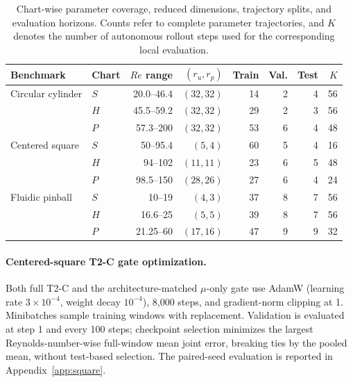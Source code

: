 \documentclass{article}
\begin{document}
\par


\begin{table}[H]
\centering
\caption{
Chart-wise parameter coverage, reduced dimensions, trajectory splits, and evaluation horizons. Counts refer to complete parameter trajectories, and $K$ denotes the number of autonomous rollout steps used for the corresponding local evaluation.
}
\label{tab:chart_splits}
\small
\setlength{\tabcolsep}{3.5pt}
\begin{tabular}{@{}llrrrrrr@{}}
\toprule
Benchmark & Chart & $Re$ range & $(r_u,r_p)$ & Train & Val. & Test & $K$ \\
\midrule
Circular cylinder
& $S$ & 20.0--46.4 & $(32,32)$ & 14 & 2 & 4 & 56 \\
& $H$ & 45.5--59.2 & $(32,32)$ & 29 & 2 & 3 & 56 \\
& $P$ & 57.3--200 & $(32,32)$ & 53 & 6 & 4 & 48 \\
\addlinespace
Centered square
& $S$ & 50--95.4 & $(5,4)$ & 60 & 5 & 4 & 16 \\
& $H$ & 94--102 & $(11,11)$ & 23 & 6 & 5 & 48 \\
& $P$ & 98.5--150 & $(28,26)$ & 27 & 6 & 4 & 24 \\
\addlinespace
Fluidic pinball
& $S$ & 10--19 & $(4,3)$ & 37 & 8 & 7 & 56 \\
& $H$ & 16.6--25 & $(5,5)$ & 39 & 8 & 7 & 56 \\
& $P$ & 21.25--60 & $(17,16)$ & 47 & 9 & 9 & 32 \\
\bottomrule
\end{tabular}
\end{table}


\par


\paragraph{Centered-square T2-C gate optimization.}
Both full T2-C and the architecture-matched $\mu$-only gate use AdamW
(learning rate $3\times10^{-4}$, weight decay $10^{-4}$), 8,000 steps,
and gradient-norm clipping at 1. Minibatches sample training windows with
replacement. Validation is evaluated at step 1 and every 100 steps;
checkpoint selection minimizes the largest Reynolds-number-wise full-window mean joint
error, breaking ties by the pooled mean, without test-based selection.
The paired-seed evaluation is reported in Appendix~\ref{app:square}.
\end{document}
